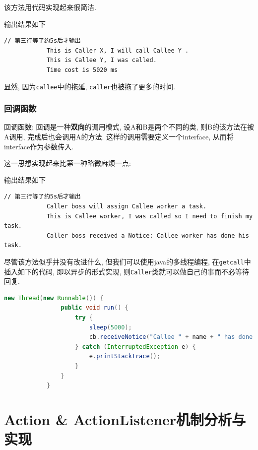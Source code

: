 \documentclass[12pt, a4paper, oneside]{ctexart}
\begin{document}
        该方法用代码实现起来很简洁. 
        

        输出结果如下
        \begin{lstlisting}[]
            // 第三行等了约5s后才输出
            This is Caller X, I will call Callee Y .
            This is Callee Y, I was called.
            Time cost is 5020 ms
        \end{lstlisting}

        显然, 因为\lstinline{callee}中的拖延, \lstinline{caller}也被拖了更多的时间. 

    \subsubsection{回调函数}

        回调函数: 回调是一种\textbf{双向}的调用模式, 设A和B是两个不同的类, 则B的该方法在被A调用, 完成后也会调用A的方法. 这样的调用需要定义一个interface, 
        从而将interface作为参数传入.

        这一思想实现起来比第一种略微麻烦一点: 
        
        输出结果如下
        \begin{lstlisting}[]
            // 第三行等了约5s后才输出
            Caller boss will assign Callee worker a task.
            This is Callee worker, I was called so I need to finish my task.
            Caller boss received a Notice: Callee worker has done his task.
        \end{lstlisting}
        尽管该方法似乎并没有改进什么, 但我们可以使用java的多线程编程, 在\lstinline{getcall}中插入如下的代码, 即以异步的形式实现, 
        则\lstinline{Caller}类就可以做自己的事而不必等待回复.
        \begin{lstlisting}[language = Java]
            new Thread(new Runnable()) {
                public void run() {
                    try {
                        sleep(5000);
                        cb.receiveNotice("Callee " + name + " has done his task.");
                    } catch (InterruptedException e) {
                        e.printStackTrace();
                    }
                }
            }
        \end{lstlisting}

\section{Action \& ActionListener机制分析与实现}
\end{document}
